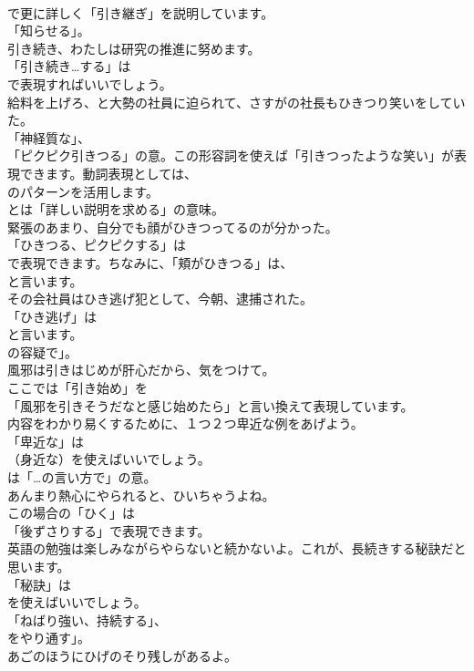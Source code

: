 \documentclass[8pt]{extreport}
\begin{document}
\begin{CJK}{UTF8}{min}
\\	で更に詳しく「引き継ぎ」を説明しています。
\\	「知らせる」。	
\\	引き続き、わたしは研究の推進に努めます。 
\\	「引き続き…する」は 
\\	で表現すればいいでしょう。	
\\	給料を上げろ、と大勢の社員に迫られて、さすがの社長もひきつり笑いをしていた。 
\\	「神経質な」、
\\	「ピクピク引きつる」の意。この形容詞を使えば「引きつったような笑い」が表現できます。動詞表現としては、
\\	のパターンを活用します。
\\	とは「詳しい説明を求める」の意味。	
\\	緊張のあまり、自分でも顔がひきつってるのが分かった。 
\\	「ひきつる、ピクピクする」は
\\	で表現できます。ちなみに、「頬がひきつる」は、
\\	と言います。	
\\	その会社員はひき逃げ犯として、今朝、逮捕された。 
\\	「ひき逃げ」は
\\	と言います。
\\	の容疑で」。	
\\	風邪は引きはじめが肝心だから、気をつけて。 
\\	ここでは「引き始め」を
\\	「風邪を引きそうだなと感じ始めたら」と言い換えて表現しています。	
\\	内容をわかり易くするために、１つ２つ卑近な例をあげよう。 
\\	「卑近な」は 
\\	（身近な）を使えばいいでしょう。
\\	は「…の言い方で」の意。	
\\	あんまり熱心にやられると、ひいちゃうよね。 
\\	この場合の「ひく」は
\\	「後ずさりする」で表現できます。	
\\	英語の勉強は楽しみながらやらないと続かないよ。これが、長続きする秘訣だと思います。 
\\	「秘訣」は
\\	を使えばいいでしょう。
\\	「ねばり強い、持続する」、
\\	をやり通す」。	
\\	あごのほうにひげのそり残しがあるよ。 

\end{CJK}
\end{document}
